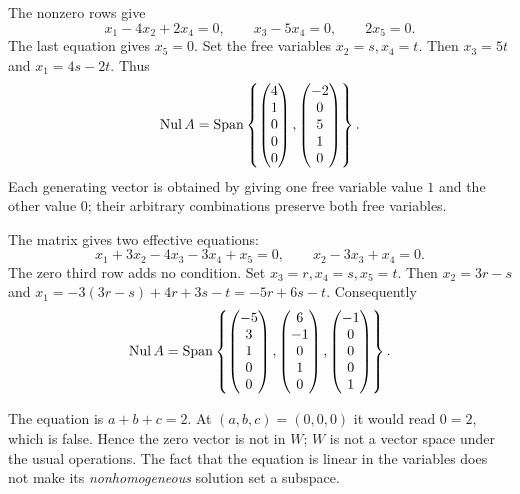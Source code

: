 The nonzero rows give
\[
 x_1-4x_2+2x_4=0,\qquad x_3-5x_4=0,\qquad 2x_5=0.
\]
The last equation gives $x_5=0$. Set the free variables $x_2=s,x_4=t$.
Then $x_3=5t$ and $x_1=4s-2t$. Thus
\[
 \operatorname{Nul} A=\operatorname{Span}\left\{
 \begin{pmatrix}4\\1\\0\\0\\0\end{pmatrix},
 \begin{pmatrix}-2\\0\\5\\1\\0\end{pmatrix}\right\}.
\]
Each generating vector is obtained by giving one free variable value $1$
and the other value $0$; their arbitrary combinations preserve both free variables.

The matrix gives two effective equations:
\[
 x_1+3x_2-4x_3-3x_4+x_5=0,\qquad x_2-3x_3+x_4=0.
\]
The zero third row adds no condition. Set $x_3=r,x_4=s,x_5=t$.
Then $x_2=3r-s$ and
$x_1=-3(3r-s)+4r+3s-t=-5r+6s-t$.
Consequently
\[
 \operatorname{Nul} A=\operatorname{Span}\left\{
 \begin{pmatrix}-5\\3\\1\\0\\0\end{pmatrix},
 \begin{pmatrix}6\\-1\\0\\1\\0\end{pmatrix},
 \begin{pmatrix}-1\\0\\0\\0\\1\end{pmatrix}\right\}.
\]

The equation is $a+b+c=2$. At $(a,b,c)=(0,0,0)$ it would read $0=2$,
which is false. Hence the zero vector is not in $W$; $W$ is not a vector
space under the usual operations. The fact that the equation is linear in
the variables does not make its \emph{nonhomogeneous} solution set a subspace.

